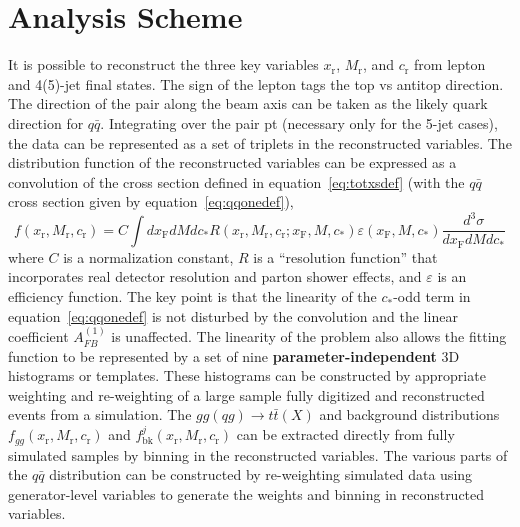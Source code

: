 \documentclass{cmspaperpdf}
\begin{document}
\section{Analysis Scheme}
It is possible to reconstruct the three key variables $x_\mathrm{r}$, $M_\mathrm{r}$, and $c_\mathrm{r}$ from lepton and 4(5)-jet final states.  The sign of the lepton tags the top vs antitop direction.  The direction of the pair along the beam axis can be taken as the likely quark direction for $q\bar q$.  Integrating over the pair pt (necessary only for the 5-jet cases), the data can be represented as a set of triplets in the reconstructed variables.  The distribution function of the reconstructed variables can be expressed as a convolution of the cross section defined in equation~\ref{eq:totxsdef} (with the $q\bar q$ cross section given by equation~\ref{eq:qqonedef}),
\begin{equation}
f(x_\mathrm{r},M_\mathrm{r},c_\mathrm{r}) = C \int dx_\mathrm{F}dMdc_* R(x_\mathrm{r},M_\mathrm{r},c_\mathrm{r}; x_\mathrm{F}, M, c_*)\varepsilon (x_\mathrm{F}, M, c_*) \frac{d^3\sigma}{dx_\mathrm{F}dM dc_*} 
\end{equation}
where $C$ is a normalization constant, $R$ is a ``resolution function'' that incorporates real detector resolution and parton shower effects, and $\varepsilon$ is an efficiency function.  The key point is that the linearity of the $c_*$-odd term in equation~\ref{eq:qqonedef} is not disturbed by the convolution and the linear coefficient $A_{FB}^{(1)}$ is unaffected.  The linearity of the problem also allows the fitting function to be represented by a set of nine {\bf parameter-independent} 3D histograms or templates.  These histograms can be constructed by appropriate weighting and re-weighting of a large sample fully digitized and reconstructed events from a simulation.  The $gg(qg)\to t\bar t(X)$ and background distributions $f_{gg}(x_\mathrm{r},M_\mathrm{r},c_\mathrm{r})$ and $f^j_\mathrm{bk}(x_\mathrm{r},M_\mathrm{r},c_\mathrm{r})$ can be extracted directly from fully simulated samples by binning in the reconstructed variables.  The various parts of the $q\bar q$ distribution can be constructed by re-weighting simulated data using generator-level variables to generate the weights and binning in reconstructed variables. 
\end{document}
